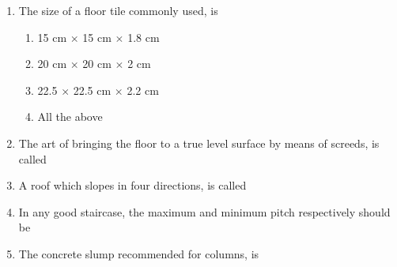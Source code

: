 \documentclass[11pt,a4paper]{article}
\begin{document}
\begin{enumerate}
\begin{enumerate*}[itemjoin=\qquad, label=\Alph*.]
\item{190 mm}
\item{200 mm}
\end{enumerate*}
\item{The size of a floor tile commonly used, is}
\begin{enumerate}[label=\Alph*.]
\item{15 cm $\times$ 15 cm $\times$ 1.8 cm}
\item{20 cm $\times$ 20 cm $\times$ 2 cm}
\item{22.5 $\times$ 22.5 cm $\times$ 2.2 cm}
\item{All the above}
\end{enumerate}
\item{The art of bringing the floor to a true level surface by means of screeds, is called}
\\
\item{A roof which slopes in four directions, is called}
\\
\item{In any good staircase, the maximum and minimum pitch respectively should be}
\\
\item{The concrete slump recommended for columns, is}
\\\begin{enumerate*}[itemjoin=\qquad, label=\Alph*.]

\end{enumerate*}
\end{enumerate}
\end{document}
